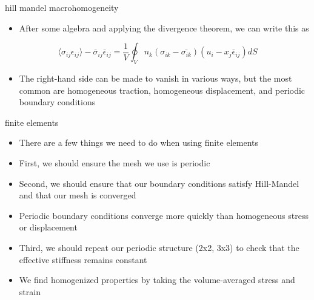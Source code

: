 \documentclass[
  letterpaper,
  ignorenonframetext,
  aspectratio=43,
  handout,
  12pt]{beamer}
\providecommand{\tightlist}{%
  \setlength{\itemsep}{0pt}\setlength{\parskip}{0pt}}
\providecommand{\tightlist}{%
\setlength{\itemsep}{0pt}\setlength{\parskip}{0pt}}
\begin{document}
\begin{frame}{hill mandel macrohomogeneity}
\protect\hypertarget{hill-mandel-macrohomogeneity-1}{}
\begin{itemize}
\tightlist
\item
  After some algebra and applying the divergence theorem, we can write
  this as
\end{itemize}

\[\langle \sigma_{ij} \epsilon_{ij} \rangle - \bar{\sigma}_{ij} \bar{\epsilon}_{ij} = \frac{1}{V} \oint_V n_k(\sigma_{ik} - \bar{\sigma_{ik}})(u_{i} - x_j\bar{\epsilon}_{ij})dS\]

\begin{itemize}
\tightlist
\item
  The right-hand side can be made to vanish in various ways, but the
  most common are homogeneous traction, homogeneous displacement, and
  periodic boundary conditions
\end{itemize}
\end{frame}

\begin{frame}{finite elements}
\protect\hypertarget{finite-elements}{}
\begin{itemize}
\tightlist
\item
  There are a few things we need to do when using finite elements
\item
  First, we should ensure the mesh we use is periodic
\item
  Second, we should ensure that our boundary conditions satisfy
  Hill-Mandel and that our mesh is converged
\item
  Periodic boundary conditions converge more quickly than homogeneous
  stress or displacement
\item
  Third, we should repeat our periodic structure (2x2, 3x3) to check
  that the effective stiffness remains constant
\item
  We find homogenized properties by taking the volume-averaged stress
  and strain
\end{itemize}
\end{frame}
\end{document}
